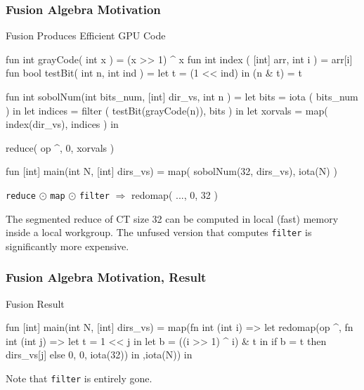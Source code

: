 \documentclass{beamer}
\newcommand{\emp}[1]{\textcolor{DikuRed}{ #1}}
\newcommand{\empr}[1]{\textcolor{CosRed}{ #1}}
\newcommand{\mymath}[1]{$ #1 $}
\begin{document}
\begin{frame}[fragile]
  \frametitle{Fusion Algebra Motivation}

\begin{block}{ Fusion Produces Efficient GPU Code}
\begin{colorcode}
fun int grayCode( int x            ) = (x >> 1) ^ x
fun int index   ( [int] arr, int i ) = arr[i]
fun bool testBit( int n,   int ind ) = let t = (1 << ind) in (n & t) = t

fun int sobolNum(int bits_num, [int] dir_vs, int n ) =
    let bits    = iota   ( bits_num )                   in
    let indices = \emp{filter} ( testBit(grayCode(n)), bits ) in
    let xorvals = \emp{map}( index(dir_vs), indices )         in

        \emp{reduce}( op ^, 0, xorvals )

fun [int] main(int N, [int] dirs_vs) =
    map( sobolNum(32, dirs_vs), iota(N) )
\end{colorcode}
\end{block}

{\tt reduce} \mymath{\odot} {\tt map} \mymath{\odot} {\tt filter} $\Rightarrow$ redomap( ..., 0, 32 )

\smallskip

The segmented reduce of CT size 32 can be computed in
local (fast) memory inside a local workgroup.
%
The unfused version that computes {\tt filter} is significantly more expensive.

\end{frame}

\begin{frame}[fragile]
\frametitle{Fusion Algebra Motivation, Result}

\begin{block}{Fusion Result}
\begin{colorcode}
fun [int] main(int N, [int] dirs_vs) =
  map(fn int (int i) => let
      redomap(op ^,
              fn int (int j) =>
                let t = 1 << j in
                let b = ((i >> 1) ^ i) & t in
                if b = t
                  then dirs_vs[j]
                  else \empr{0},
              \empr{0}, iota(32)) in
      ,iota(N)) in
\end{colorcode}
\end{block}

Note that {\tt filter} is entirely gone.
\end{frame}
\end{document}
